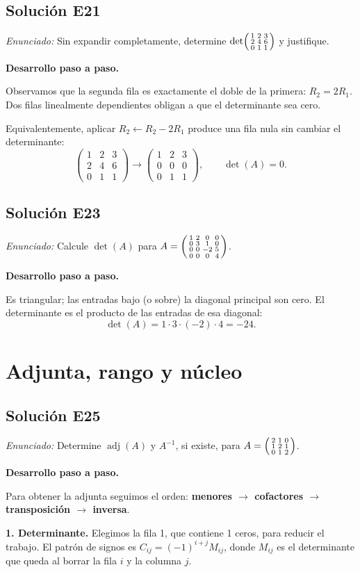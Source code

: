 \documentclass[12pt]{article}
\theoremstyle{remark}
\newcommand{\adj}{\operatorname{adj}}
\newcommand{\solucion}[2]{\Needspace{11\baselineskip}\subsection*{Solución E#1}\noindent\textit{Enunciado:} #2\par\medskip\noindent\textbf{Desarrollo paso a paso.}\par\medskip}
\begin{document}
\medskip

\solucion{21}{Sin expandir completamente, determine $\det\begin{psmallmatrix}1&2&3\\2&4&6\\0&1&1\end{psmallmatrix}$ y justifique.}
Observamos que la segunda fila es exactamente el doble de la primera: $R_2=2R_1$. Dos filas linealmente dependientes obligan a que el determinante sea cero.

Equivalentemente, aplicar $R_2\leftarrow R_2-2R_1$ produce una fila nula sin cambiar el determinante:
\[
\begin{pmatrix}1&2&3\\2&4&6\\0&1&1\end{pmatrix}\longrightarrow\begin{pmatrix}1&2&3\\0&0&0\\0&1&1\end{pmatrix},\qquad \boxed{\det(A)=0}.
\]

\medskip

\solucion{23}{Calcule $\det(A)$ para $A=\begin{psmallmatrix}1&2&0&0\\0&3&1&0\\0&0&-2&5\\0&0&0&4\end{psmallmatrix}$.}
Es triangular; las entradas bajo (o sobre) la diagonal principal son cero. El determinante es el producto de las entradas de esa diagonal:
\[
\det(A)=1\cdot 3\cdot (-2)\cdot 4=-24.
\]

\medskip

\section{Adjunta, rango y núcleo}

\solucion{25}{Determine $\adj(A)$ y $A^{-1}$, si existe, para $A=\begin{psmallmatrix}2&1&0\\1&2&1\\0&1&2\end{psmallmatrix}$.}
Para obtener la adjunta seguimos el orden: \textbf{menores $\to$ cofactores $\to$ transposición $\to$ inversa}.

\textbf{1. Determinante.}
Elegimos la fila 1, que contiene 1 ceros, para reducir el trabajo. El patrón de signos es $C_{ij}=(-1)^{i+j}M_{ij}$, donde $M_{ij}$ es el determinante que queda al borrar la fila $i$ y la columna $j$.
\end{document}
